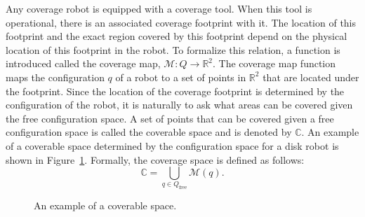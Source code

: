 \documentclass[../main.tex]{subfiles}
\begin{document}
Any coverage robot is equipped with a coverage tool. When this tool is operational, there is an associated coverage footprint with it. The location of this footprint and the exact region covered by this footprint depend on the physical location of this footprint in the robot. To formalize this relation, a function is introduced called the coverage map, $\mathcal{M}:Q\to \mathbb{R}^2$. The coverage map function maps the configuration $q$ of a robot to a set of points in $\mathbb{R}^2$ that are located under the footprint. Since the location of the coverage footprint is determined by the configuration of the robot, it is naturally to ask what areas can be covered given the free configuration space. A set of points that can be covered given a free configuration space is called the coverable space and is denoted by $\mathbb{C}$. An example of a coverable space determined by the configuration space for a disk robot is shown in Figure~\ref{fig:coverable_space}. Formally, the coverage space is defined as follows:
\begin{equation}
	\mathbb{C}=\bigcup_{q\in Q_{\text{free}}}\mathcal{M}(q).
\end{equation}
\begin{figure}
	\centering
	
	\caption{An example of a coverable space.}
	\label{fig:coverable_space}
\end{figure}








\end{document}
